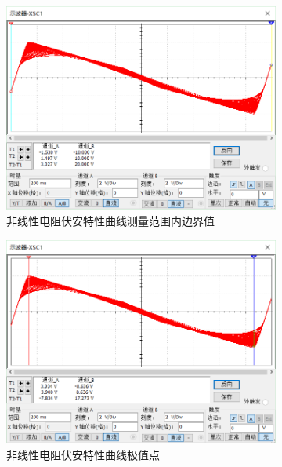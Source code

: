 \documentclass{article}
\begin{document}
\begin{figure}[htbp]
	\centering
	\begin{subfigure}[htbp]{.30\linewidth}
		\centering
		\includegraphics[width=\linewidth]{ChuaVA1.png}
		\caption{非线性电阻伏安特性曲线测量范围内边界值}
		\label{fig:非线性电阻伏安特性曲线测量范围内边界值}
	\end{subfigure}
	\quad
	\begin{subfigure}[htbp]{.30\linewidth}
		\centering
		\includegraphics[width=\linewidth]{ChuaVA2.png}
		\caption{非线性电阻伏安特性曲线极值点}
		\label{fig:非线性电阻伏安特性曲线极值点}
	\end{subfigure}
	\quad
	\begin{subfigure}[htbp]{.30\linewidth}

\end{subfigure}
\end{figure}
\end{document}

